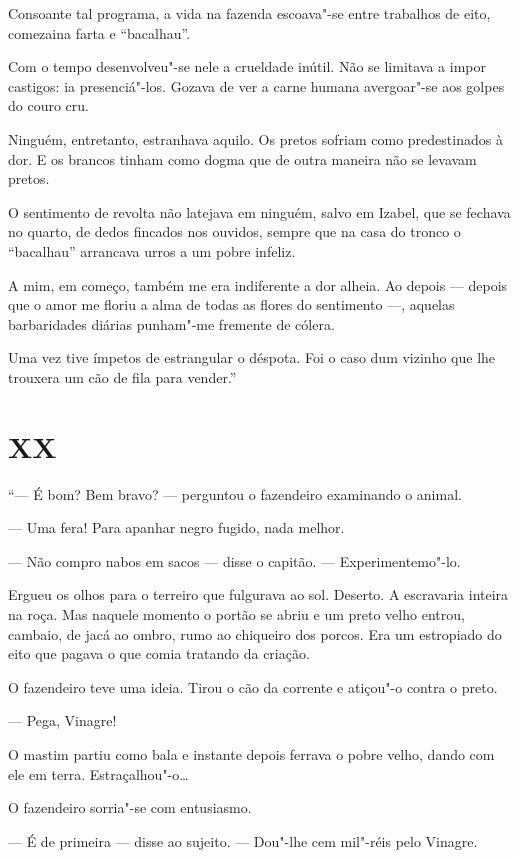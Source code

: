 Consoante tal programa, a vida na fazenda escoava"-se entre trabalhos de
eito, comezaina farta e ``bacalhau''.

Com o tempo desenvolveu"-se nele a crueldade inútil. Não se limitava a
impor castigos: ia presenciá"-los. Gozava de ver a carne humana
avergoar"-se aos golpes do couro cru.

Ninguém, entretanto, estranhava aquilo. Os pretos sofriam como
predestinados à dor. E os brancos tinham como dogma que de outra maneira
não se levavam pretos.

O sentimento de revolta não latejava em ninguém, salvo em Izabel, que se
fechava no quarto, de dedos fincados nos ouvidos, sempre que na casa do
tronco o ``bacalhau'' arrancava urros a um pobre infeliz.

A mim, em começo, também me era indiferente a dor alheia. Ao depois ---
depois que o amor me floriu a alma de todas as flores do sentimento ---,
aquelas barbaridades diárias punham"-me fremente de cólera.

Uma vez tive ímpetos de estrangular o déspota. Foi o caso dum vizinho
que lhe trouxera um cão de fila para vender.''

\section*{XX}

``--- É bom? Bem bravo? --- perguntou o fazendeiro examinando o animal.

--- Uma fera! Para apanhar negro fugido, nada melhor.

--- Não compro nabos em sacos --- disse o capitão. --- Experimentemo"-lo.

Ergueu os olhos para o terreiro que fulgurava ao sol. Deserto. A
escravaria inteira na roça. Mas naquele momento o portão se abriu e um
preto velho entrou, cambaio, de jacá ao ombro, rumo ao chiqueiro dos
porcos. Era um estropiado do eito que pagava o que comia tratando da
criação.

O fazendeiro teve uma ideia. Tirou o cão da corrente e atiçou"-o contra o
preto.

--- Pega, Vinagre!

O mastim partiu como bala e instante depois ferrava o pobre velho, dando
com ele em terra. Estraçalhou"-o\ldots{}

O fazendeiro sorria"-se com entusiasmo.

--- É de primeira --- disse ao sujeito. --- Dou"-lhe cem mil"-réis pelo
Vinagre.

